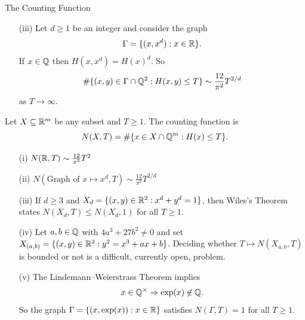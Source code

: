 \documentclass{beamer}
\begin{document}
\begin{frame}{The Counting Function}
  \begin{example}[Continued]
    \begin{enumerate}
    \item[(iii)] Let $d\ge 1$ be an integer and consider the graph
      $$\Gamma = \{(x,x^d) : x\in {\mathbb{R}}\}.$$
      If $x\in{\mathbb{Q}}$ then $H(x,x^d) = H(x)^d$.
      So
      \begin{equation*}
        \#\{ (x,y) \in \Gamma\cap {\mathbb{Q}}^2 : H(x,y)\le T\} \sim
        \frac{12}{\pi^2}T^{2/d} 
      \end{equation*}
      as $T\rightarrow\infty$. 
    \end{enumerate}  
  \end{example}
  \begin{definition}
    Let $X\subseteq{\mathbb{R}}^m$ be any subset and $T\ge 1$. The \alert{counting
      function} is 
    \begin{equation*}
      N(X,T) = \#\{ x\in X\cap {\mathbb{Q}}^m : H(x)\le T\}. 
    \end{equation*}
  \end{definition}
\end{frame}


\begin{frame}
  \begin{example}
    \begin{enumerate}
    \item[(i)] $N({\mathbb{R}},T)\sim \frac{12}{\pi^2} T^2$

    \item[(ii)] $N(\text{Graph of $x\mapsto x^d$},T) \sim \frac{12}{\pi^2}T^{2/d}$

    \item[(iii)] If $d\ge 3$ and $X_d = \{(x,y) \in {\mathbb{R}}^2 : x^d+y^d=1\}$,
      then Wiles's Theorem states $N(X_d,T) \le N(X_d,1)$ for all $T\ge
      1$.

    \item[(iv)] Let $a,b\in{\mathbb{Q}}$ with $4a^3+27b^2\not=0$ and set
      $X_{(a,b)}= \{(x,y)\in{\mathbb{R}}^2 : y^2=x^3+ax+b\}$.      
      Deciding whether  $T\mapsto N(X_{a,b},T)$ is bounded or not
      is a difficult, currently \alert{open}, problem.

    \item[(v)] The Lindemann--Weierstrass Theorem implies
       $$x\in{\mathbb{Q}}^\times \Rightarrow \exp(x) \not\in{\mathbb{Q}}.$$
      So the graph
      $\Gamma=\{(x,\exp(x)) : x\in{\mathbb{R}}\}$ satisfies $N(\Gamma,T)=1$ for all
      $T\ge 1$.      
    \end{enumerate}
  \end{example}
\end{frame}
\end{document}
